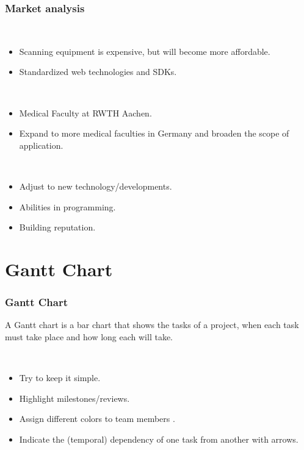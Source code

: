 \begin{frame}
  \frametitle{Market analysis}
      \begin{description}[]
        \item[Industry cost structure] \hfill \\
        \begin{itemize}
          \item Scanning equipment is expensive, but will become more affordable.
          \item Standardized web technologies and SDKs.
        \end{itemize}

        \item[Distribution Channels] \hfill \\
          \begin{itemize}
            \item Medical Faculty at RWTH Aachen.
            \item Expand to more medical faculties in Germany and  broaden the scope of application.
        \end{itemize}

\item[Key Success Factors] \hfill \\
          \begin{itemize}
            \item Adjust to new technology/developments.
           \item Abilities in programming.
	\item Building reputation.
\end{itemize}
\end{description}
\end{frame}

\section{Gantt Chart}

\begin{frame}
  \frametitle{Gantt Chart}
A Gantt chart is a bar chart that shows the tasks of a project, when each task must take place and how long each will take.  
  \begin{description}[]
	\item[Conventions] \hfill \\
	\begin{itemize}
	\item Try to keep it simple.
          \item Highlight milestones/reviews.
        \item Assign different colors to team members .
        \item Indicate the (temporal) dependency of one task from another with arrows.
      \end{itemize}
 \end{description}
\end{frame}


